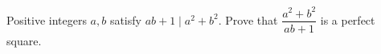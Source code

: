 Positive integers $a,b$ satisfy $ab+1\mid a^2+b^2$. Prove that $\dfrac{a^2+b^2}{ab+1}$ is a perfect square.
